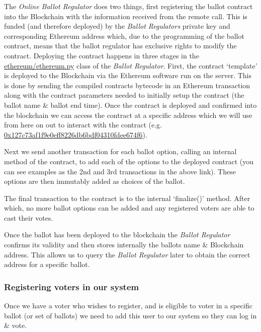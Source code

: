 \documentclass{article}
\begin{document}
The \textit{Online Ballot Regulator} does two things, first registering the ballot contract into the Blockchain with the information received from the remote call. This is funded (and therefore deployed) by the \textit{Ballot Regulators} private key and corresponding Ethereum address which, due to the programming of the ballot contract, means that the ballot regulator has exclusive rights to modify the contract. Deploying the contract happens in three stages in the \href{https://github.com/Mattie432/Blockchain-Voting-System/blob/master/Programming/4_OnlineBallotRegulator/ethereum/ethereum.py}{ethereum/ethereum.py} class of the \textit{Ballot Regulator}. First, the contract `template' is deployed to the Blockchain via the Ethereum software run on the server. This is done by sending the compiled contracts bytecode in an Ethereum transaction along with the contract parameters needed to initially setup the contract (the ballot name \& ballot end time). Once the contract is deployed and confirmed into the blockchain we can access the contract at a specific address which we will use from here on out to interact with the contract (e.g. \href{https://etherscan.io/address/0x127c73af1f9e0eff8226db6bdf04310fdee674f6}{0x127c73af1f9e0eff8226db6bdf04310fdee674f6}).

Next we send another transaction for each ballot option, calling an internal method of the contract, to add each of the options to the deployed contract (you can see examples as the 2nd and 3rd transactions in the above link). These options are then immutably added as choices of the ballot.

The final transaction to the contract is to the internal `finalize()' method. After which, no more ballot options can be added and any registered voters are able to cast their votes.

Once the ballot has been deployed to the blockchain the \textit{Ballot Regulator} confirms its validity and then stores internally the ballots name \& Blockchain address. This allows us to query the \textit{Ballot Regulator} later to obtain the correct address for a specific ballot.


\cleardoublepage
\subsubsection{Registering voters in our system}
Once we have a voter who wishes to register, and is eligible to voter in a specific ballot (or set of ballots) we need to add this user to our system so they can log in \& vote.
\end{document}
